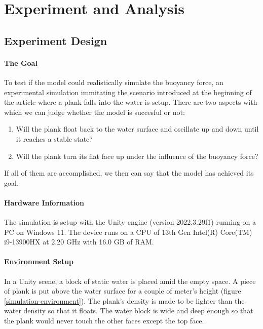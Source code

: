 \section{Experiment and Analysis}

\subsection{Experiment Design}

\paragraph{The Goal}

To test if the model could realistically simulate the buoyancy force, an experimental simulation immitating the scenario introduced at the beginning of the article where a plank falls into the water is setup.
There are two aspects with which we can judge whether the model is succesful or not:
\begin{enumerate}
	\item Will the plank float back to the water surface and oscillate up and down until it reaches a stable state?
	\item Will the plank turn its flat face up under the influence of the buoyancy force?
\end{enumerate}
If all of them are accomplished, we then can say that the model has achieved its goal.

\paragraph{Hardware Information}

The simulation is setup with the Unity engine (version 2022.3.29f1) running on a PC on Windows 11.
The device runs on a CPU of 13th Gen Intel(R) Core(TM) i9-13900HX at 2.20 GHz with 16.0 GB of RAM.

\paragraph{Environment Setup}

In a Unity scene, a block of static water is placed amid the empty space.
A piece of plank is put above the water surface for a couple of meter's height (figure \ref{simulation-environment}).
The plank's density is made to be lighter than the water density so that it floats.
The water block is wide and deep enough so that the plank would never touch the other faces except the top face.

